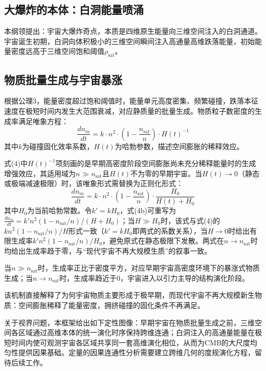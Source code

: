 \documentclass[UTF8]{csoarticle}
\begin{document}
\subsection{大爆炸的本体：白洞能量喷涌}
本纲领提出：宇宙大爆炸奇点，本质是四维原生能量向三维空间注入的白洞通道。宇宙诞生初期，白洞向体积极小的三维空间瞬间注入高通量高维跌落能量，初始能量密度远高于三维空间饱和阈值$\rho_{\text{sat}}$。

\subsection{物质批量生成与宇宙暴涨}
根据公理3，能量密度超过饱和阈值时，能量单元高度密集、频繁碰撞，跌落本征速度在极短时间内发生大范围衰减，对应静质量的批量生成。物质粒子数密度的生成率满足唯象方程：
\begin{equation}
\frac{dn_m}{dt} = k \cdot n^2 \cdot \left( 1 - \frac{n_{\text{sat}}}{n} \right) \cdot H(t)^{-1}
\end{equation}
其中$k$为碰撞固化效率系数，$H(t)$为哈勃参数，描述空间膨胀的稀释效应。

式(4)中$H(t)^{-1}$项刻画的是早期高密度阶段空间膨胀尚未充分稀释能量时的生成增强效应，其适用域为$n \gg n_{\text{sat}}$且$H(t)$不为零的早期宇宙。当$H(t) \to 0$（静态或极端减速极限）时，该唯象形式需替换为正则化形式：
\begin{equation*}
\frac{dn_m}{dt} = k \cdot n^2 \cdot \left( 1 - \frac{n_{\text{sat}}}{n} \right) \cdot \frac{H_0}{H(t) + H_0}
\tag{4b}
\end{equation*}
其中$H_0$为当前哈勃常数。令$k' = k H_0$，式(4b)可重写为$\frac{dn_m}{dt} = k' n^2 (1-n_{\text{sat}}/n)/(H+H_0)$；当$H \gg H_0$时，该式与式(4)的$k n^2 (1-n_{\text{sat}}/n)/H$形式一致（$k'=kH_0$即两式的系数关系），当$H \to 0$时给出有限生成率$k' n^2 (1-n_{\text{sat}}/n)/H_0$，避免原式在静态极限下发散。两式在$n \to n_{\text{sat}}$时均给出生成率趋于零，与“现代宇宙不再大规模生质”的叙事一致。

当$n \gg n_{\text{sat}}$时，生成率正比于密度平方，对应早期宇宙高密度环境下的暴涨式物质生成；当$n \to n_{\text{sat}}$时，生成率趋近于0，宇宙进入以引力主导的结构演化阶段。

该机制直接解释了为何宇宙物质主要形成于极早期，而现代宇宙不再大规模新生物质：空间膨胀稀释了能量密度，拥挤碰撞的固化条件不再满足。

关于视界问题，本框架给出如下定性图像：早期宇宙在物质批量生成之前，三维空间各区域通过高维本体的统一演化时序保持跨维连通；白洞注入的高通量能量在极短时间内使可观测宇宙各区域共享同一套高维演化相位，从而为CMB的大尺度均匀性提供因果基础。定量的因果连通性分析需要建立跨维几何的度规演化方程，留待后续工作。
\end{document}
